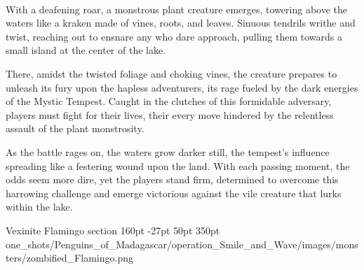 \vfill\eject

\vspace*{3.5cm}\hfill\\
With a deafening roar, a monstrous plant creature emerges, towering above the waters like a kraken made of vines, roots, and leaves. Sinuous tendrils writhe and twist, reaching out to ensnare any who dare approach, pulling them towards a small island at the center of the lake.

There, amidst the twisted foliage and choking vines, the creature prepares to unleash its fury upon the hapless adventurers, its rage fueled by the dark energies of the Mystic Tempest. Caught in the clutches of this formidable adversary, players must fight for their lives, their every move hindered by the relentless assault of the plant monstrosity.

As the battle rages on, the waters grow darker still, the tempest's influence spreading like a festering wound upon the land. With each passing moment, the odds seem more dire, yet the players stand firm, determined to overcome this harrowing challenge and emerge victorious against the vile creature that lurks within the lake.

\def\primarycolor{titlered}%
\def\secondarycolor{white}%
\MonsterBannerGraphic%
	{Vexinite Flamingo} %
	{section} %
	{160pt} %
	{-27pt} %
	{50pt} %
	{350pt} %
	{\PATH one_shots/Penguins_of_Madagascar/operation_Smile_and_Wave/images/monsters/zombified_Flamingo.png} %
	{} %
\label{sec:VexiniteFlamingo}
%

